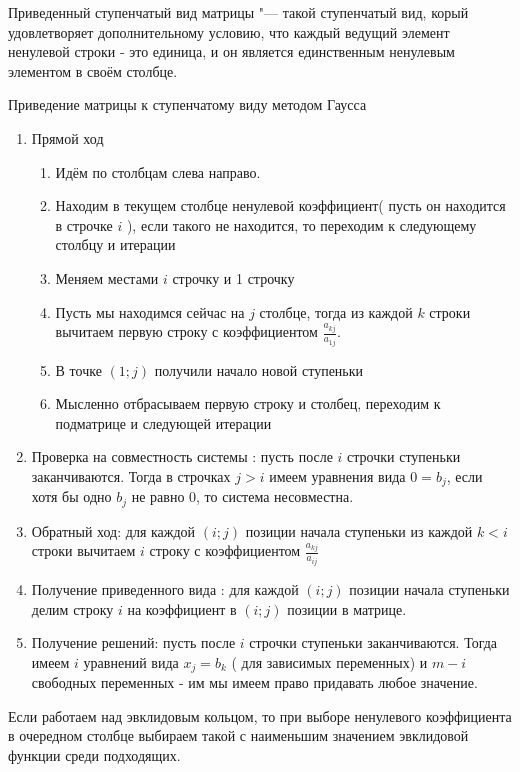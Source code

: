 \begin{Def}
Приведенный ступенчатый вид матрицы "--- такой ступенчатый вид, корый удовлетворяет дополнительному условию, что каждый ведущий элемент ненулевой строки - это единица, и он является единственным ненулевым элементом в своём столбце.
\end{Def}
\begin{Def}
Приведение матрицы к ступенчатому виду методом Гаусса 
\begin{enumerate}
\item Прямой ход
\begin{enumerate}
\item Идём по столбцам слева направо. 
\item Находим в текущем столбце ненулевой коэффициент( пусть он находится в строчке $i$ ), если такого не находится, то переходим к следующему столбцу и итерации
\item Меняем местами $i$ строчку и 1 строчку
\item Пусть мы находимся сейчас на $j$ столбце, тогда из каждой $k$ строки вычитаем первую строку с коэффициентом $\frac{a_{kj}}{a_{1j}}$. 
\item В точке $(1;j)$ получили начало новой ступеньки
\item Мысленно отбрасываем первую строку и столбец, переходим к подматрице и следующей итерации
\end{enumerate}
\item Проверка на совместность системы : пусть после $i$ строчки ступеньки заканчиваются. Тогда в строчках $j>i$ имеем уравнения вида $0=b_j$, если хотя бы одно $b_j$ не равно 0, то система несовместна. 
\item Обратный ход: для каждой $(i;j)$ позиции начала ступеньки из каждой $k < i$ строки вычитаем $i$ строку с коэффициентом $\frac{a_{kj}}{a_{ij}}$
\item Получение приведенного вида : для каждой $(i;j)$ позиции начала ступеньки делим строку $i$ на коэффициент в $(i;j)$ позиции в матрице.
\item Получение решений: пусть после $i$ строчки ступеньки заканчиваются. Тогда имеем $i$ уравнений вида $x_j=b_k$ ( для зависимых переменных) и $m-i$ свободных переменных - им мы имеем право придавать любое значение. 
\end{enumerate}
\begin{Rem}
Если работаем над эвклидовым кольцом, то при выборе ненулевого коэффициента в очередном столбце выбираем такой с наименьшим значением эвклидовой функции среди подходящих.
\end{Rem}
\end{Def}



